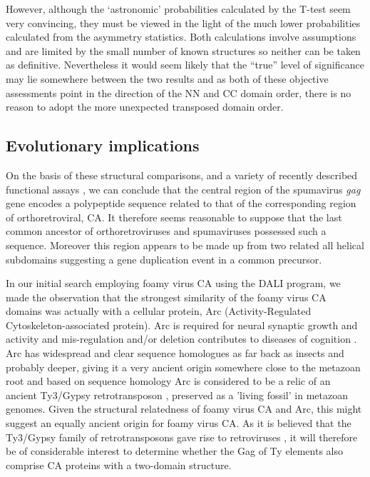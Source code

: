 \documentclass{bmcart}
\begin{document}
However, although the ‘astronomic’ probabilities calculated by the T-test seem very convincing, they
must be viewed in the light of the much lower probabilities calculated from the asymmetry statistics.
Both calculations involve assumptions and are limited by the small number of known structures so neither
can be taken as definitive. Nevertheless it would seem likely that the “true” level of significance may
lie somewhere between the two results and as both of these objective assessments point in the direction
of the NN and CC domain order, there is no reason to adopt the more unexpected transposed domain order.


\subsection*{Evolutionary implications}

On the basis of these structural comparisons, and a variety of recently described functional assays \cite{BallNJet16}, 
we can conclude that the central region of the spumavirus {\em gag} gene encodes a polypeptide sequence related to that of 
the corresponding region of orthoretroviral, CA. It therefore seems reasonable to suppose that the last 
common ancestor of orthoretroviruses and spumaviruses possessed such a sequence. Moreover this region appears 
to be made up from two related all helical subdomains suggesting a gene duplication event in a common precursor. 

In our initial search employing foamy virus CA using the DALI program, we made the observation that the strongest
similarity of the foamy virus CA domains was actually with a cellular protein, Arc (Activity-Regulated
Cytoskeleton-associated protein).  Arc is required for neural synaptic growth and activity
\cite{ChowdhurySet06,ParkSet08,ShepherdJDet06,WaungMWet08} and mis-regulation and/or deletion contributes
to diseases of cognition \cite{NiereFet12,ParkSet08,WaungMWet08}.  Arc has widespread and clear sequence
homologues as far back as insects and probably deeper, giving it a very ancient origin somewhere close to the
metazoan root \cite{CampillosMet06,VolffJN09} and based on sequence homology Arc is considered to be a relic
of an ancient Ty3/Gypsy retrotransposon \cite{ZhangWet15}, preserved as a ’living fossil’ in metazoan genomes.
Given the structural relatedness of foamy virus CA and Arc, this might suggest an equally ancient origin for
foamy virus CA. As it is believed that the Ty3/Gypsy family of retrotransposons gave rise to retroviruses
\cite{LlorensCet08}, it will therefore be of considerable interest to determine whether the Gag of Ty elements
also comprise CA proteins with a two-domain structure.
\end{document}
